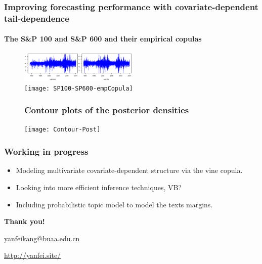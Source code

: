 \documentclass[10pt,aspectratio=169]{beamer}
\begin{document}
\begin{frame}
  \frametitle{Improving forecasting performance with covariate-dependent tail-dependence}
  \framesubtitle{The S\&P 100 and S\&P 600 and their empirical copulas}
 \begin{figure}[!h]
    \centering
    \includegraphics[width=0.5\textwidth]{SP100-SP600}\\
    \texttt{[image: SP100-SP600-empCopula]}
  \end{figure}
\end{frame}

\begin{frame}
  \frametitle{}

  \begin{figure}[!h]
    \frametitle{Contour plots of the posterior densities}
    \centering
    \texttt{[image: Contour-Post]}
  \end{figure}

\end{frame}



\begin{frame}
  \frametitle{Working in progress }

  \begin{itemize}
  \item Modeling multivariate covariate-dependent structure via the vine copula.
  \item Looking into more efficient inference techniques, VB?
  \item Including probabilistic topic model to model the texts margins.
  \end{itemize}
\end{frame}


%   
%   
\begin{frame}[plain]
  \addtocounter{framenumber}{-1}
  \begin{center}
    {\color{SUblue} \textbf{\Huge Thank you!}}
    \vspace{1cm}

    \url{yanfeikang@buaa.edu.cn}

    \vspace{1cm}

    \url{http://yanfei.site/}

  \end{center}
\end{frame}
\end{document}
